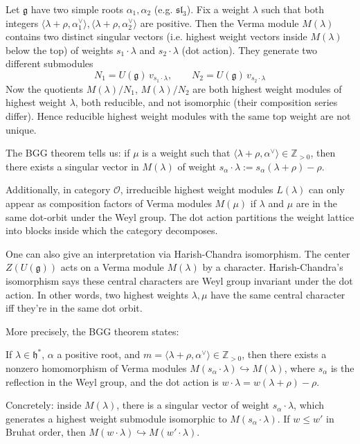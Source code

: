 \documentclass[12pt]{article}
\begin{document}
\begin{remark} Let $\mathfrak{g}$ have two simple roots $\alpha_1, \alpha_2$ (e.g. $\mathfrak{sl}_3$). Fix a weight $\lambda$ such that both integers
    $\langle \lambda+\rho, \alpha_1^\vee \rangle, \langle \lambda+\rho, \alpha_2^\vee \rangle$
    are positive. Then the Verma module $M(\lambda)$ contains two distinct singular vectors (i.e. highest weight vectors inside $M(\lambda)$ below the top) of weights $s_1\!\cdot\!\lambda$ and $s_2\!\cdot\!\lambda$ (dot action).
    They generate two different submodules \[N_1 = U(\mathfrak{g})\,v_{s_1\cdot\lambda}, \qquad  N_2 = U(\mathfrak{g})\,v_{s_2\cdot\lambda}\] Now the quotients $M(\lambda)/N_1$, $M(\lambda)/N_2$ are both highest weight modules of highest weight $\lambda$, both reducible, and not isomorphic (their composition series differ). Hence reducible highest weight modules with the same top weight are not unique.
\end{remark}

\begin{remark}
     The BGG theorem tells us: if $\mu$ is a weight such that $\langle \lambda+\rho,\alpha^\vee\rangle \in \mathbb{Z}_{>0}$, then there exists a singular vector in $M(\lambda)$ of weight $s_\alpha\cdot\lambda := s_\alpha(\lambda+\rho)-\rho$.

    Additionally, in category $\mathcal{O}$, irreducible highest weight modules $L(\lambda)$ can only appear as composition factors of Verma modules $M(\mu)$ if $\lambda$ and $\mu$ are in the same dot-orbit under the Weyl group. The dot action partitions the weight lattice into blocks inside which the category decomposes.

    One can also give an interpretation via Harish-Chandra isomorphism. The center $Z(U(\mathfrak{g}))$ acts on a Verma module $M(\lambda)$ by a character. Harish-Chandra's isomorphism says these central characters are Weyl group invariant under the dot action. In other words, two highest weights $\lambda,\mu$ have the same central character iff they're in the same dot orbit.
\end{remark}

More precisely, the BGG theorem states:
\begin{theorem}
    If $\lambda \in \mathfrak{h}^*$, $\alpha$ a positive root, and
    $m = \langle \lambda+\rho, \alpha^\vee\rangle \in \mathbb{Z}_{>0}$,
    then there exists a nonzero homomorphism of Verma modules
    $M(s_\alpha \cdot \lambda) \hookrightarrow M(\lambda)$,
    where $s_\alpha$ is the reflection in the Weyl group, and the dot action is
    $w \cdot \lambda = w(\lambda+\rho) - \rho$.


    Concretely: inside $M(\lambda)$, there is a singular vector of weight $s_\alpha \cdot \lambda$, which generates a highest weight submodule isomorphic to $M(s_\alpha \cdot \lambda)$. If $w \leq w'$ in Bruhat order, then $M(w \cdot \lambda) \hookrightarrow M(w' \cdot \lambda)$.
\end{theorem}
\end{document}
